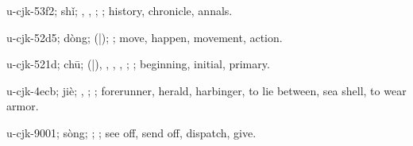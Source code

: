 \begin{multicols}{2}
{\cjkgGlue{}u-cjk-53f2; shǐ; \cjkgGlue{}, \cjkgGlue{}, \cjkgGlue{}; \cjkgGlue{}; history, chronicle, annals.

\cjkgGlue{}u-cjk-52d5; dòng; \cjkgGlue{}\cjkgGlue{}(\cjkgGlue{}|\cjkgGlue{}); \cjkgGlue{}; move, happen, movement, action.

\cjkgGlue{}u-cjk-521d; chū; \cjkgGlue{}\cjkgGlue{}(\cjkgGlue{}|\cjkgGlue{}), \cjkgGlue{}, \cjkgGlue{}, \cjkgGlue{}\cjkgGlue{}\cjkgGlue{}, \cjkgGlue{}\cjkgGlue{}\cjkgGlue{}; \cjkgGlue{}; beginning, initial, primary.

\cjkgGlue{}u-cjk-4ecb; jiè; \cjkgGlue{}, \cjkgGlue{}; \cjkgGlue{}; forerunner, herald, harbinger, to lie between, sea shell, to wear armor.

\cjkgGlue{}u-cjk-9001; sòng; \cjkgGlue{}\cjkgGlue{}\cjkgGlue{}; \cjkgGlue{}; see off, send off, dispatch, give.

}
\end{multicols}
